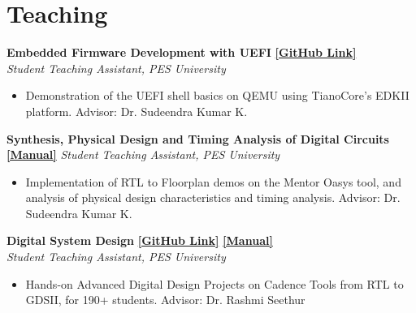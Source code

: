 \section{\sc Teaching}

{\bf{Embedded Firmware Development with UEFI}} \href{https://github.com/govardhnn/UEFI_AHP}{{\bf{[GitHub Link]}}} \\
\textit{Student Teaching Assistant, PES University}
\begin{itemize}
    \setlength\itemsep{0em}
      \item Demonstration of the UEFI shell basics on QEMU using TianoCore’s EDKII platform.
        \subitem Advisor: Dr. Sudeendra Kumar K. 
\end{itemize}

{\bf{Synthesis, Physical Design and Timing Analysis of Digital Circuits}}  \href{https://bit.ly/mentorlabpesu}{{\bf{[Manual]}}}
\textit{Student Teaching Assistant, PES University} 
\begin{itemize}
    \setlength\itemsep{0em}
      \item Implementation of RTL to Floorplan demos on the Mentor Oasys tool, and analysis
    of physical design characteristics and timing analysis.
        \subitem Advisor: Dr. Sudeendra Kumar K. 
\end{itemize}

{\bf{Digital System Design}} \href{https://github.com/govardhnn/DSD_AHP}{{\bf[GitHub Link]}} \href{https://bit.ly/cadencelabpesu}{{\bf{[Manual]}}} \\
\textit{Student Teaching Assistant, PES University}
\begin{itemize}
\setlength\itemsep{0em}
  \item Hands-on Advanced Digital Design Projects on Cadence Tools from RTL to GDSII, for 190+ students.
    \subitem Advisor: Dr. Rashmi Seethur 
\end{itemize}

\endinput
